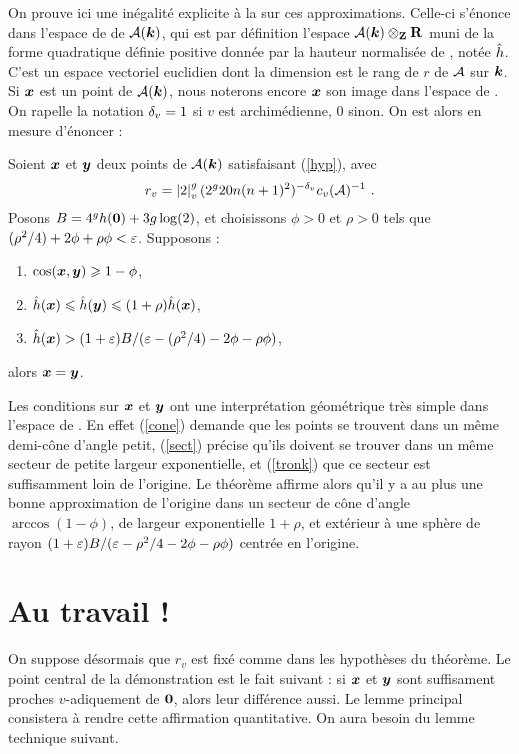 On prouve ici une inégalité explicite à la  sur ces
approximations. Celle-ci s'énonce dans l'espace de  de
$\mathcal{A}(\boldsymbol{k})$, qui est par définition l'espace $\mathcal{A}(\boldsymbol{k})\otimes_{\mathbf{Z}} \mathbf{R}$ muni de la
forme quadratique définie positive donnée par la hauteur normalisée de
, notée $\hat{h}$. C'est un espace vectoriel euclidien dont la
dimension est le rang de  $r$ de $\mathcal{A}$ sur $\boldsymbol{k}$. Si ${\boldsymbol{x}}$
est un point de $\mathcal{A}(\boldsymbol{k})$, nous noterons encore ${\boldsymbol{x}}$ son image dans
l'espace de . On rapelle la notation ${\delta_v} = 1$ si $v$ est
archimédienne, $0$ sinon. On est alors en mesure d'énoncer :

\begin{thm} \label{mumpt}
  Soient ${\boldsymbol{x}}$ et ${\boldsymbol{y}}$ deux points de $\mathcal{A}(\boldsymbol{k})$ satisfaisant (\ref{hyp}),
  avec
  \[
  r_v = \left\lvert2\right\rvert_{v}^g(2^g20n(n+1)^2)^{-{\delta_v}} c_v(\mathcal{A})^{-1} \text{ .}
  \]
  Posons $B =
  4^gh({\boldsymbol{0}})+ 3g\log(2)$, et choisissons $\phi > 0$ et $\rho > 0$ tels que
  $(\rho^2/4) + 2\phi + \rho\phi< \varepsilon$. Supposons :
  \begin{enumerate}
  \item $\cos({\boldsymbol{x}},{\boldsymbol{y}}) \geqslant 1-\phi$, \label{cone}
  \item $\hat{h}({\boldsymbol{x}}) \leqslant \hat{h}({\boldsymbol{y}}) \leqslant (1+\rho)\hat{h}({\boldsymbol{x}})$, \label{sect}
  \item $\hat{h}({\boldsymbol{x}}) > (1+\varepsilon)B/(\varepsilon - (\rho^2/4) - 2\phi - \rho\phi)$,
    \label{tronk}
  \end{enumerate}
  alors ${\boldsymbol{x}} = {\boldsymbol{y}}$.
\end{thm}

Les conditions sur ${\boldsymbol{x}}$ et ${\boldsymbol{y}}$ ont une interprétation géométrique très
simple dans l'espace de . En effet (\ref{cone}) demande que
les points se trouvent dans un même demi-cône d'angle petit, (\ref{sect})
précise qu'ils doivent se trouver dans un même secteur de petite largeur
exponentielle, et (\ref{tronk}) que ce secteur est suffisamment loin de
l'origine. Le théorème affirme alors qu'il y a au plus une bonne approximation
de l'origine dans un secteur de cône d'angle $\arccos(1-\phi)$, de largeur
exponentielle $1+\rho$, et extérieur à une sphère de rayon $(1+\varepsilon)B/(\varepsilon -
\rho^2/4 - 2\phi - \rho\phi )$ centrée en l'origine.

\section{Au travail !}

On suppose désormais que $r_v$ est fixé comme dans les hypothèses du théorème.
Le point central de la démonstration est le fait suivant : si ${\boldsymbol{x}}$ et
${\boldsymbol{y}}$ sont suffisament proches $v$-adiquement de ${\boldsymbol{0}}$, alors leur
différence aussi. Le lemme principal consistera à rendre cette affirmation
quantitative. On aura besoin du lemme technique suivant.

